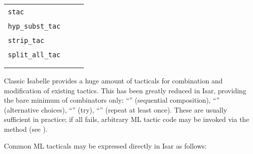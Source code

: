 \begin{isabellebody}
\begin{isamarkuptext}
  \medskip
  \begin{tabular}{lll}
    \verb|stac|~\isa{{\isachardoublequote}a\ {\isadigit{1}}{\isachardoublequote}} & & \isa{{\isachardoublequote}subst\ a{\isachardoublequote}} \\
    \verb|hyp_subst_tac|~\isa{{\isadigit{1}}} & & \isa{hypsubst} \\
    \verb|strip_tac|~\isa{{\isadigit{1}}} & \isa{{\isachardoublequote}{\isasymapprox}{\isachardoublequote}} & \isa{{\isachardoublequote}intro\ strip{\isachardoublequote}} \\
    \verb|split_all_tac|~\isa{{\isadigit{1}}} & & \isa{{\isachardoublequote}simp\ {\isacharparenleft}no{\isacharunderscore}asm{\isacharunderscore}simp{\isacharparenright}\ only{\isacharcolon}\ split{\isacharunderscore}tupled{\isacharunderscore}all{\isachardoublequote}} \\
      & \isa{{\isachardoublequote}{\isasymapprox}{\isachardoublequote}} & \isa{{\isachardoublequote}simp\ only{\isacharcolon}\ split{\isacharunderscore}tupled{\isacharunderscore}all{\isachardoublequote}} \\
      & \isa{{\isachardoublequote}{\isasymlless}{\isachardoublequote}} & \isa{{\isachardoublequote}clarify{\isachardoublequote}} \\
  \end{tabular}%
\end{isamarkuptext}%
\isamarkuptrue%
%
\isamarkuptrue%
%
\begin{isamarkuptext}%
Classic Isabelle provides a huge amount of tacticals for combination
  and modification of existing tactics.  This has been greatly reduced
  in Isar, providing the bare minimum of combinators only: ``\isa{{\isachardoublequote}{\isacharcomma}{\isachardoublequote}}'' (sequential composition), ``\isa{{\isachardoublequote}{\isacharbar}{\isachardoublequote}}'' (alternative
  choices), ``\isa{{\isachardoublequote}{\isacharquery}{\isachardoublequote}}'' (try), ``\isa{{\isachardoublequote}{\isacharplus}{\isachardoublequote}}'' (repeat at least
  once).  These are usually sufficient in practice; if all fails,
  arbitrary ML tactic code may be invoked via the \hyperlink{method.tactic}{\mbox{}}
  method (see ).

  \medskip Common ML tacticals may be expressed directly in Isar as
  follows:


\end{isamarkuptext}
\end{isabellebody}
